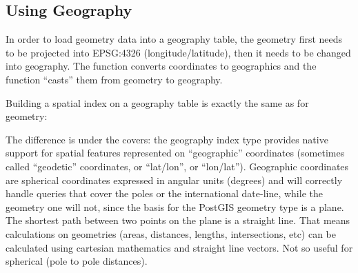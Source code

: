 \documentclass[a4paper,11pt,english]{sphinxmanual}
\begin{document}
\subsection{Using Geography}
\label{\detokenize{basic:using-geography}}
In order to load geometry data into a geography table, the geometry first needs to be projected into EPSG:4326 (longitude/latitude), then it needs to be changed into geography.  The  function converts coordinates to geographics and the  function “casts” them from geometry to geography.

\begin{sphinxVerbatim}[commandchars=\\\{\}]
   
    
 
\end{sphinxVerbatim}

Building a spatial index on a geography table is exactly the same as for geometry:

\begin{sphinxVerbatim}[commandchars=\\\{\}]
  
    
\end{sphinxVerbatim}

The difference is under the covers: the geography index type provides native support for spatial features represented on “geographic” coordinates (sometimes called “geodetic” coordinates, or “lat/lon”, or “lon/lat”). Geographic coordinates are spherical coordinates expressed in angular units (degrees) and will correctly handle queries that cover the poles or the international date-line, while the geometry one will not, since the basis for the PostGIS geometry type is a plane. The shortest path between two points on the plane is a straight line. That means calculations on geometries (areas, distances, lengths, intersections, etc) can be calculated using cartesian mathematics and straight line vectors. Not so useful for spherical (pole to pole distances).
\end{document}
